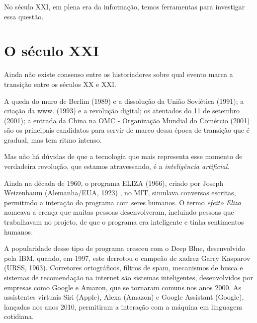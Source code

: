 \documentclass{hipatia}
\begin{document}
No século XXI, em plena era da informação, temos ferramentas para investigar essa questão. 


































\section{O século XXI}

Ainda não existe consenso entre os historiadores sobre qual evento marca a transição entre os séculos XX e XXI.

	A queda do muro de Berlim (1989) e a dissolução da União Soviética (1991); a criação da www. (1993) e a revolução digital; os atentados do 11 de setembro (2001); a entrada da China na OMC - Organização Mundial do Comércio (2001) são os principais candidatos para servir de marco dessa época de transição que é gradual, mas tem ritmo intenso.

	Mas não há dúvidas de que a tecnologia que mais representa esse momento de verdadeira revolução, que estamos atravessando, é a \textit{inteligência artificial}.

	Ainda na década de 1960, o programa ELIZA (1966), criado por Joseph Weizenbaum (Alemanha/EUA, 1923) 	\cite{Weizenbaum1966}, no MIT, simulava conversas escritas, permitindo a interação do programa com seres humanos. O termo \textit{efeito Eliza} nomeava a crença que muitas pessoas desenvolveram, incluindo pessoas que trabalhavam no projeto, de que o programa era inteligente e tinha sentimentos humanos.

	A popularidade desse tipo de programa cresceu com o Deep Blue, desenvolvido pela IBM, quando, em 1997, este derrotou o campeão de xadrez Garry Kasparov (URSS, 1963). Corretores ortográficos, filtros de spam, mecanismos de busca e sistemas de recomendação na internet são sistemas inteligentes, desenvolvidos por empresas como Google e Amazon, que se tornaram comuns nos anos 2000. As assistentes virtuais Siri (Apple), Alexa (Amazon) e Google Assistant (Google), lançadas nos anos 2010, permitiram a interação com a máquina em linguagem cotidiana.
\end{document}
